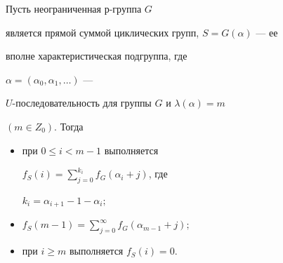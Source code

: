 \begin{thms}


Пусть неограниченная $р$-группа $G$


является прямой суммой циклических групп, $S=G(\alpha)$ --- ее


вполне характеристическая подгруппа, где


$\alpha=(\alpha_0,\alpha_1,\dotsc)$ ---


$U$-последовательность для группы $G$ и $\lambda(\alpha)=m$


$(m \in Z_0)$. Тогда


\begin{itemize}


\item[1)] при $0\leq i<m-1$ выполняется


$f_S(i)=\sum\limits_{j=0}^{k_i} f_G(\alpha_i+j)$, где


$k_i=\alpha_{i+1}-1-\alpha_i;$


\item[2)] $f_S(m-1)=\sum\limits_{j=0}^\infty f_G(\alpha_{m-1}+j);$


\item[3)] при $i\geq m$ выполняется $f_S(i)=0$.


\end{itemize}


\end{thms}





